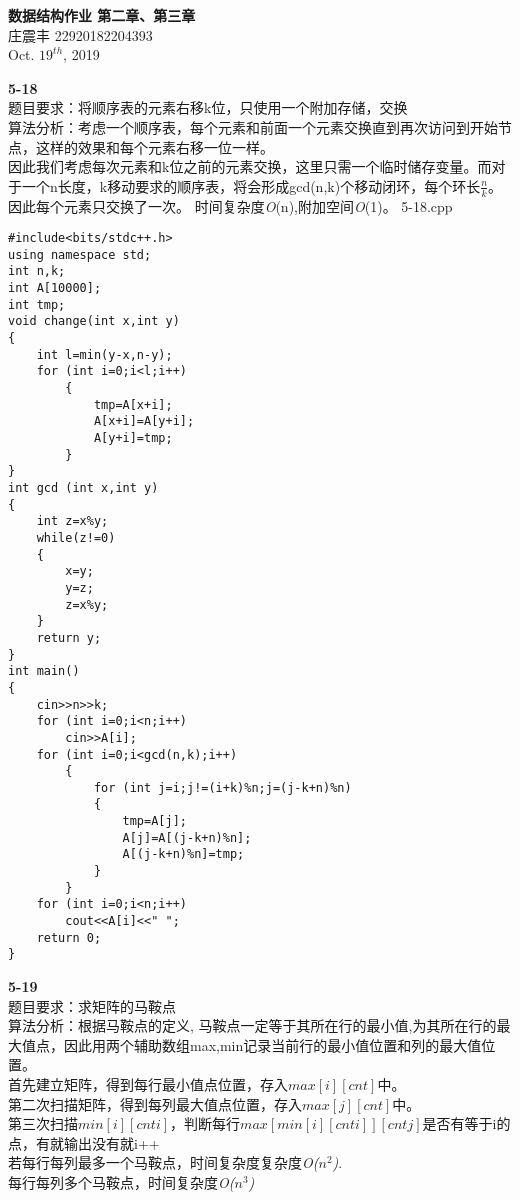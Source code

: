 \documentclass[UTF8,a4paper]{article}
\begin{document}
\begin{center}
    \textbf{\LARGE{数据结构作业 第二章、第三章}}\\[0.5cm]
    \normalsize{庄震丰 22920182204393}\\[0.3cm]
    \large{Oct. $19^{th}$, 2019}
\end{center}
\textbf{5-18}\\
    题目要求：将顺序表的元素右移k位，只使用一个附加存储，交换\\
    算法分析：考虑一个顺序表，每个元素和前面一个元素交换直到再次访问到开始节点，这样的效果和每个元素右移一位一样。\\
    因此我们考虑每次元素和k位之前的元素交换，这里只需一个临时储存变量。而对于一个n长度，k移动要求的顺序表，将会形成gcd(n,k)个移动闭环，每个环长$\frac{n}{k}$。因此每个元素只交换了一次。
    时间复杂度\textit{O}(n),附加空间\textit{O}(1)。
    5-18.cpp
\begin{lstlisting}
#include<bits/stdc++.h>
using namespace std;
int n,k;
int A[10000];
int tmp;
void change(int x,int y)
{
    int l=min(y-x,n-y);
    for (int i=0;i<l;i++)
        {   
            tmp=A[x+i];
            A[x+i]=A[y+i];
            A[y+i]=tmp;
        }
}
int gcd (int x,int y)
{
    int z=x%y;
    while(z!=0)
    {
        x=y;
        y=z;
        z=x%y;
    }
    return y;
}
int main()
{
    cin>>n>>k;
    for (int i=0;i<n;i++)
        cin>>A[i];
    for (int i=0;i<gcd(n,k);i++)
        {
            for (int j=i;j!=(i+k)%n;j=(j-k+n)%n)
            {
                tmp=A[j];
                A[j]=A[(j-k+n)%n];
                A[(j-k+n)%n]=tmp;
            }
        }
    for (int i=0;i<n;i++)
        cout<<A[i]<<" ";
    return 0;
}
\end{lstlisting}
\textbf{5-19}\\
    题目要求：求矩阵的马鞍点\\
     算法分析：根据马鞍点的定义, 马鞍点一定等于其所在行的最小值,为其所在行的最大值点，因此用两个辅助数组max,min记录当前行的最小值位置和列的最大值位置。\\
    首先建立矩阵，得到每行最小值点位置，存入$max[i][cnt]$中。\\
    第二次扫描矩阵，得到每列最大值点位置，存入$max[j][cnt]$中。\\
    第三次扫描$min[i][cnti]$，判断每行$max[min[i][cnti]][cntj]$是否有等于i的点，有就输出没有就i++\\
    若每行每列最多一个马鞍点，时间复杂度复杂度\textit{O($n^2$)}.\\
    每行每列多个马鞍点，时间复杂度\textit{O($n^3$)}\\
\end{document}
